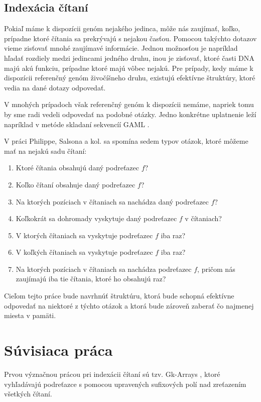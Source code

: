 \subsection{Indexácia čítaní}

Pokiaľ máme k dispozícii genóm nejakého jedinca, môže nás zaujímať, koľko, prípadne
ktoré čítania sa prekrývajú s nejakou časťou. Pomocou takýchto dotazov vieme zisťovať
mnohé zaujímavé informácie. Jednou možnosťou je napríklad hľadať rozdiely medzi
jedincami jedného druhu, inou je zisťovať, ktoré časti DNA majú akú funkciu, prípadne
ktoré majú vôbec nejakú. Pre prípady, kedy máme k dispozícii referenčný genóm živočíšneho
druhu, existujú efektívne štruktúry, ktoré vedia na dané dotazy odpovedať.

V mnohých prípadoch však referenčný genóm k dispozícii nemáme, napriek tomu by sme
radi vedeli odpovedať na podobné otázky. Jedno konkrétne uplatnenie leží napríklad
v metóde skladaní sekvencíí GAML \cite{gaml}.

V práci Philippe, Salsona a kol. \cite{gk_arrays} sa spomína sedem typov otázok,
ktoré môžeme mať na nejakú sadu čítaní:

\begin{enumerate}
    \item Ktoré čítania obsahujú daný podreťazec $f$?
    \item Koľko čítaní obsahuje daný podreťazec $f$?
    \item Na ktorých pozíciach v čítaniach sa nachádza daný podreťazec $f$?
    \item Koľkokrát sa dohromady vyskytuje daný podreťazec $f$ v čítaniach?
    \item V ktorých čítaniach sa vyskytuje podreťazec $f$ iba raz?
    \item V koľkých čítaniach sa vyskytuje podreťazec $f$ iba raz?
    \item Na ktorých pozíciach v čítaniach sa nachádza podreťazec $f$, pričom nás
    zaujímajú iba tie čítania, ktoré ho obsahujú raz?
\end{enumerate}

Cieľom tejto práce bude navrhnúť
štruktúru, ktorá bude schopná efektívne odpovedať na niektoré z týchto otázok
a ktorá bude zároveň zaberať čo najmenej miesta v pamäti.

\section{Súvisiaca práca}

Prvou význačnou prácou pri indexácii čítaní sú tzv. Gk-Arrays \cite{gk_arrays}, ktoré
vyhľadávajú podreťazce s pomocou upravených sufixových polí nad zreťazením všetkých
čítaní.

